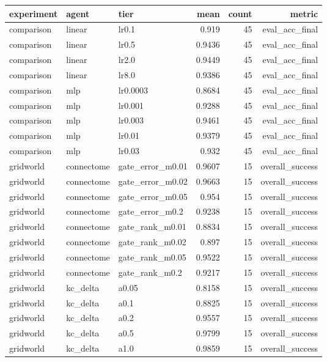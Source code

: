 \begin{table}[t]
\centering
\small
\begin{tabular}{lllrrr}
\toprule
experiment & agent & tier & mean & count & metric \\
\midrule
comparison & linear & lr0.1 & 0.919 & 45 & eval\_acc\_final \\
comparison & linear & lr0.5 & 0.9436 & 45 & eval\_acc\_final \\
comparison & linear & lr2.0 & 0.9449 & 45 & eval\_acc\_final \\
comparison & linear & lr8.0 & 0.9386 & 45 & eval\_acc\_final \\
comparison & mlp & lr0.0003 & 0.8684 & 45 & eval\_acc\_final \\
comparison & mlp & lr0.001 & 0.9288 & 45 & eval\_acc\_final \\
comparison & mlp & lr0.003 & 0.9461 & 45 & eval\_acc\_final \\
comparison & mlp & lr0.01 & 0.9379 & 45 & eval\_acc\_final \\
comparison & mlp & lr0.03 & 0.932 & 45 & eval\_acc\_final \\
gridworld & connectome & gate\_error\_m0.01 & 0.9607 & 15 & overall\_success \\
gridworld & connectome & gate\_error\_m0.02 & 0.9663 & 15 & overall\_success \\
gridworld & connectome & gate\_error\_m0.05 & 0.954 & 15 & overall\_success \\
gridworld & connectome & gate\_error\_m0.2 & 0.9238 & 15 & overall\_success \\
gridworld & connectome & gate\_rank\_m0.01 & 0.8834 & 15 & overall\_success \\
gridworld & connectome & gate\_rank\_m0.02 & 0.897 & 15 & overall\_success \\
gridworld & connectome & gate\_rank\_m0.05 & 0.9522 & 15 & overall\_success \\
gridworld & connectome & gate\_rank\_m0.2 & 0.9217 & 15 & overall\_success \\
gridworld & kc\_delta & a0.05 & 0.8158 & 15 & overall\_success \\
gridworld & kc\_delta & a0.1 & 0.8825 & 15 & overall\_success \\
gridworld & kc\_delta & a0.2 & 0.9557 & 15 & overall\_success \\
gridworld & kc\_delta & a0.5 & 0.9799 & 15 & overall\_success \\
gridworld & kc\_delta & a1.0 & 0.9859 & 15 & overall\_success \\

\end{tabular}
\end{table}
